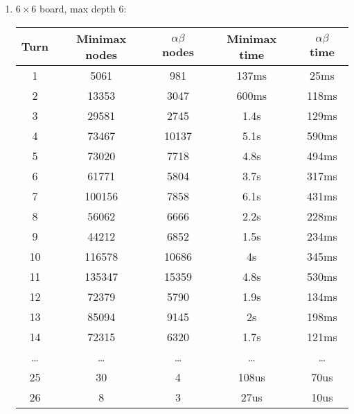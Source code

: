 \documentclass[12pt]{article}
\begin{document}
\begin{enumerate}
\begin{enumerate}
\begin{table}[h]
\begin{tabular}{|c|c|c|c|c|}
		\end{tabular}
	\end{table}

\newpage
\item $6 \times 6$ board, max depth 6: \\
	 \begin{table}[h]
		 \centering
		 \begin{tabular}{|c|c|c|c|c|}
			 \hline
			 Turn & Minimax nodes & \( \alpha\beta \) nodes & Minimax time & \( \alpha\beta \) time \\ \hline
			 1 & 5061   & 981   &  137ms & 25ms     \\ \hline
			 2 & 13353  & 3047  &  600ms & 118ms    \\ \hline
			 3 & 29581  & 2745  &  1.4s  & 129ms    \\ \hline
			 4 & 73467  & 10137 &  5.1s  & 590ms    \\ \hline
			 5 & 73020  & 7718  &  4.8s  & 494ms    \\ \hline
			 6 & 61771  & 5804  &  3.7s  & 317ms    \\ \hline
			 7 & 100156 & 7858  &  6.1s  & 431ms    \\ \hline
			 8 & 56062  & 6666  &  2.2s  & 228ms    \\ \hline
			 9 & 44212  & 6852  &  1.5s  & 234ms    \\ \hline
			10 & 116578 & 10686 &  4s    & 345ms    \\ \hline
			11 & 135347 & 15359 &  4.8s  & 530ms    \\ \hline
			12 & 72379  & 5790  &  1.9s  & 134ms    \\ \hline
			13 & 85094  & 9145  &  2s    & 198ms    \\ \hline
			14 & 72315  & 6320  &  1.7s  & 121ms    \\ \hline
	\ldots & \ldots & \ldots& \ldots & \ldots   \\ \hline
			25 & 30     & 4     &  108us & 70us     \\ \hline
			26 &  8     & 3     &  27us  & 10us     \\ \hline
		\end{tabular}
	\end{table}

\newpage


\end{enumerate}
\end{enumerate}
\end{document}
